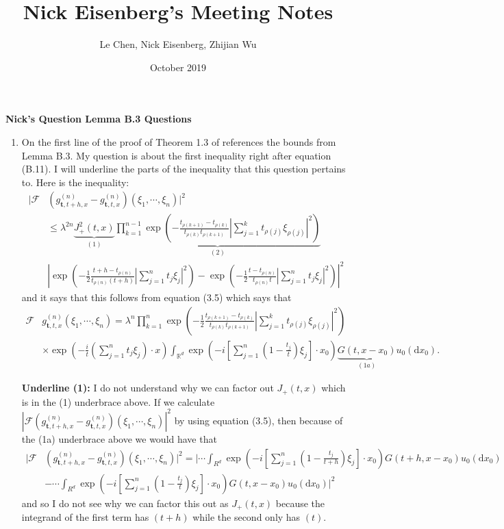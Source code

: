 \documentclass[a4paper,11pt]{article}
\title{Nick Eisenberg's Meeting Notes}
\author{Le Chen, Nick Eisenberg, Zhijian Wu}
\date{October 2019}
\numberwithin{equation}{section}
\theoremstyle{plain}
\theoremstyle{definition}
\newcommand{\ud}{\ensuremath{\mathrm{d} }}
\newcommand{\R}{\mathbb{R}}
\newcounter{NQ}
\newenvironment{NickQuestion}[1][] %
{\refstepcounter{NQ}
	\begin{mdframed}[backgroundcolor=lightgray]\textbf{Nick's Question \theNQ \: #1~~}~~~\noindent}%
	{\end{mdframed}}
\numberwithin{NQ}{section}
\numberwithin{LQ}{section}
\numberwithin{ZQ}{section}
\begin{document}
\begin{NickQuestion}[Lemma B.3 Questions]
	\begin{enumerate}
		\item On the first line of the proof of Theorem 1.3 of \cite{BC2017} references the bounds from Lemma B.3. My question is about the first inequality right after equation (B.11). I will underline the parts of the inequality that this question pertains to. Here is the inequality:
		\begin{align*}
			| \mathcal{F} & (g_{ \textbf{t}, t+h, x }^{(n)}  - g_{ \textbf{t}, t, x }^{(n)} ) (\xi_1 , \cdots , \xi_n)|^2 
		\\& \le \lambda^{2n} \underbrace{ J_+^2(t,x) }_{(1)}   \underbrace{ \prod_{k=1}^{n-1} \exp\left( - \frac{ t_{\rho(k+1)}  - t_{\rho(k)} }{ t_{\rho(k)}t_{\rho(k+1)} } \left| \sum_{j=1}^k t_{\rho(j)}\xi_{\rho(j)} \right|^2  \right) }_{(2)}
		\\&  \left| \exp\left( -\frac{1}{2} \frac{ t+h  - t_{\rho(n)} }{ t_{\rho(n)} (t+h) } \left| \sum_{j=1}^n t_j\xi_j \right|^2  \right)  -  \exp\left( -\frac{1}{2} \frac{ t - t_{\rho(n)} }{ t_{\rho(n)} t} \left| \sum_{j=1}^n t_j\xi_j \right|^2  \right)   \right|^2
		\end{align*}
	and it says that this follows from equation (3.5) which says that 
		\begin{align}
			 \mathcal{F} & g_{ \textbf{t}, t, x }^{(n)} (\xi_1 , \cdots , \xi_n) = \lambda^n \prod_{k=1}^n \exp\left( -\frac{1}{2}\frac{ t_{\rho(k+1)}  - t_{\rho(k)} }{ t_{\rho(k)}t_{\rho(k+1)} } \left| \sum_{j=1}^k t_{\rho(j)}\xi_{\rho(j)} \right|^2 \right)
			 \\& \times \exp \left( -\frac{i}{t} \left( \sum_{j=1}^n t_j \xi_j \right) \cdot x \right) \int_{\R^d} \exp \left( -i \left[ \sum_{j=1}^n \left( 1- \frac{t_j}{t} \right) \xi_j  \right] \cdot x_0 \right) \underbrace{ G(t,x-x_0) }_{(1a)} u_0(\ud x_0).
		\end{align}
		
\textbf{Underline (1):} I do not understand why we can factor out $J_+(t,x)$ which is in the (1) underbrace above. If we calculate $	| \mathcal{F} (g_{ \textbf{t}, t+h, x }^{(n)}  - g_{ \textbf{t}, t, x }^{(n)} ) (\xi_1 , \cdots , \xi_n)|^2 $ by using equation (3.5), then because of the (1a) underbrace above we would have that 
	\begin{align*}
			| \mathcal{F} & (g_{ \textbf{t}, t+h, x }^{(n)}  - g_{ \textbf{t}, t, x }^{(n)} ) (\xi_1 , \cdots , \xi_n)|^2 = \Bigg| \cdots \int_{R^d} \exp \left( -i \left[ \sum_{j=1}^n \left( 1- \frac{t_j}{t+h} \right) \xi_j  \right] \cdot x_0 \right)G(t+h,x-x_0)u_0(\ud x_0) 
			\\& - \cdots \int_{R^d} \exp \left( -i \left[ \sum_{j=1}^n \left( 1- \frac{t_j}{t} \right) \xi_j  \right] \cdot x_0 \right)G(t,x-x_0)u_0(\ud x_0) \Bigg|^2
	\end{align*}
and so I do not see why we can factor this out as $J_+(t,x)$ because the integrand of the first term has $(t+h)$ while the second only has $(t)$. 


\end{enumerate}
\end{NickQuestion}
\end{document}

